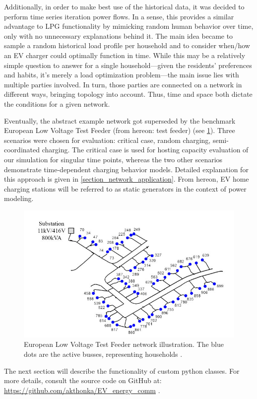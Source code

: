 \documentclass[a4paper,10pt]{report}
\begin{document}
Additionally, in order to make best use of the historical data, it was decided to perform time series iteration power flows. In a sense, this provides a similar advantage to LPG functionality by mimicking random human behavior over time, only with no unnecessary explanations behind it. The main idea became to sample a random historical load profile per household and to consider when/how an EV charger could optimally function in time. While this may be a relatively simple question to answer for a single household---given the residents' preferences and habits, it's merely a load optimization problem---the main issue lies with multiple parties involved. In turn, those parties are connected on a network in different ways, bringing topology into account. Thus, time and space both dictate the conditions for a given network.

Eventually, the abstract example network got superseded by the benchmark European Low Voltage Test Feeder (from hereon: test feeder) (see \cref{EU_LV_test_feeder}). Three scenarios were chosen for evaluation: critical case, random charging, semi-coordinated charging. The critical case is used for hosting capacity evaluation of our simulation for singular time points, whereas the two other scenarios demonstrate time-dependent charging behavior models. Detailed explanation for this approach is given in \cref{section_network_application}. From hereon, EV home charging stations will be referred to as static generators in the context of power modeling.

\begin{figure}[htpb]
	\centering
	\includegraphics[width=0.6\linewidth]{EU_LV_test_feeder}
	\caption[European Low Voltage Test Feeder layout]{European Low Voltage Test Feeder network illustration. The blue dots are the active busses, representing households \cite{Nousdilis2017}.}
	\label{EU_LV_test_feeder}
\end{figure}

The next section will describe the functionality of custom python classes. For more details, consult the source code on GitHub at: \url{https://github.com/akthonka/EV_energy_comm} .
\end{document}

